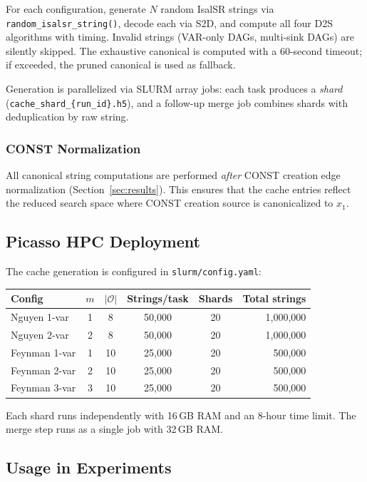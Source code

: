 For each configuration, generate $N$ random IsalSR strings via
\texttt{random\_isalsr\_string()}, decode each via S2D, and compute all four
D2S algorithms with timing. Invalid strings (VAR-only DAGs, multi-sink DAGs)
are silently skipped. The exhaustive canonical is computed with a 60-second
timeout; if exceeded, the pruned canonical is used as fallback.

Generation is parallelized via SLURM array jobs: each task produces a
\emph{shard} (\texttt{cache\_shard\_\{run\_id\}.h5}), and a follow-up
merge job combines shards with deduplication by raw string.

\subsubsection{CONST Normalization}

All canonical string computations are performed \emph{after} CONST creation
edge normalization (Section~\ref{sec:results}). This ensures that the cache
entries reflect the reduced search space where CONST creation source is
canonicalized to $x_1$.

\subsection{Picasso HPC Deployment}

The cache generation is configured in \texttt{slurm/config.yaml}:

\begin{center}
\begin{tabular}{lccccr}
\toprule
Config & $m$ & $|\mathcal{O}|$ & Strings/task & Shards & Total strings \\
\midrule
Nguyen 1-var & 1 & 8 & 50{,}000 & 20 & 1{,}000{,}000 \\
Nguyen 2-var & 2 & 8 & 50{,}000 & 20 & 1{,}000{,}000 \\
Feynman 1-var & 1 & 10 & 25{,}000 & 20 & 500{,}000 \\
Feynman 2-var & 2 & 10 & 25{,}000 & 20 & 500{,}000 \\
Feynman 3-var & 3 & 10 & 25{,}000 & 20 & 500{,}000 \\
\bottomrule
\end{tabular}
\end{center}

Each shard runs independently with 16\,GB RAM and an 8-hour time limit.
The merge step runs as a single job with 32\,GB RAM.

\subsection{Usage in Experiments}

